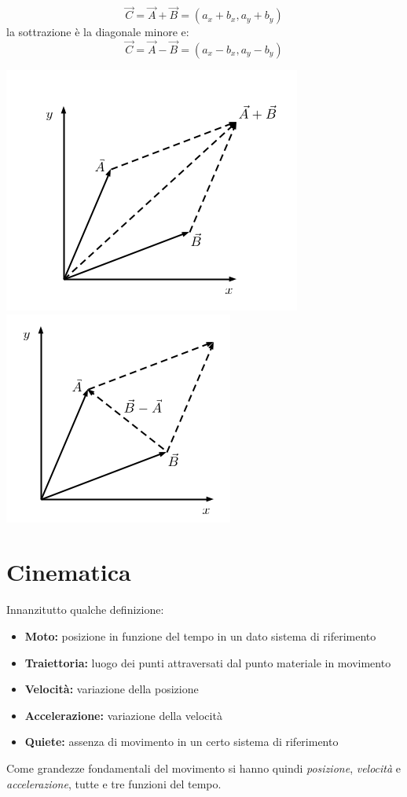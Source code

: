 \documentclass[a4paper,12pt, oneside]{book}
\begin{document}
$$\vec{C}=\vec{A}+\vec{B}=(a_x+b_x, a_y+b_y)$$
la sottrazione è la diagonale minore e:
$$\vec{C}=\vec{A}-\vec{B}=(a_x-b_x, a_y-b_y)$$
\begin{center}
	\includegraphics[scale=0.5]{img/vec.png}
	\quad
	\includegraphics[scale=0.5]{img/vec2.png}
\end{center}
\section{Cinematica}
Innanzitutto qualche definizione:
\begin{itemize}
	\item \textbf{Moto:} posizione in funzione del tempo in un dato sistema di riferimento
	\item \textbf{Traiettoria:} luogo dei punti attraversati dal punto materiale in movimento
	\item \textbf{Velocità:} variazione della posizione
	\item \textbf{Accelerazione:} variazione della velocità
	\item \textbf{Quiete:} assenza di movimento in un certo sistema di riferimento
\end{itemize}
Come grandezze fondamentali del movimento si hanno quindi \textit{posizione}, \textit{velocità} e \textit{accelerazione}, tutte e tre funzioni del tempo.
\end{document}
